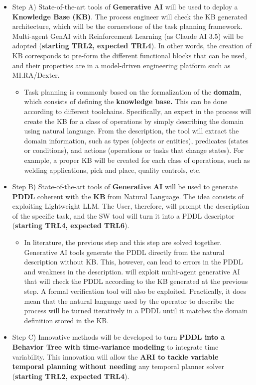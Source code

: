 \begin{itemize}[arrow]
\item
  Step A) State-of-the-art tools of \textbf{Generative AI} will be used
  to deploy a \textbf{Knowledge Base (KB)}. The process engineer will
  check the KB generated architecture, which will be the cornerstone of
  the task planning framework. Multi-agent GenAI with Reinforcement
  Learning (as Claude AI 3.5) will be adopted (\textbf{starting TRL2,
  expected TRL4}). In other words, the creation of KB corresponds to
  pre-form the different functional blocks that can be used, and their
  properties are in a model-driven engineering platform such as
  MI.RA/Dexter.

  \begin{itemize}
  \item
    Task planning is commonly based on the formalization of the
    \textbf{domain}, which consists of defining the \textbf{knowledge
    base.} This can be done according to different toolchains.
    Specifically, an expert in the process will create the KB for a
    class of operations by simply describing the domain using natural
    language. From the description, the tool will extract the domain
    information, such as types (objects or entities), predicates (states
    or conditions), and actions (operations or tasks that change
    states). For example, a proper KB will be created for each class of
    operations, such as welding applications, pick and place, quality
    controls, etc.
  \end{itemize}
\item
  Step B) State-of-the-art tools of \textbf{Generative AI} will be used
  to generate \textbf{PDDL} coherent with the \textbf{KB} from Natural
  Language. The idea consists of exploiting Lightweight LLM. The User,
  therefore, will prompt the description of the specific task, and the
  SW tool will turn it into a PDDL descriptor (\textbf{starting TRL4,
  expected TRL6}).

  \begin{itemize}
  \item
    In literature, the previous step and this step are solved together.
    Generative AI tools generate the PDDL directly from the natural
    description without KB. This, however, can lead to errors in the
    PDDL and weakness in the description.  will exploit
    multi-agent generative AI that will check the PDDL according to the
    KB generated at the previous step. A formal verification tool will
    also be exploited. Practically, it does mean that the natural
    language used by the operator to describe the process will be turned
    iteratively in a PDDL until it matches the domain definition stored
    in the KB.
  \end{itemize}
\item
  Step C) Innovative methods will be developed to turn \textbf{PDDL into
  a Behavior Tree with time-variance modeling} to integrate time
  variability. This innovation will allow the \textbf{ARI to tackle
  variable temporal planning without needing} any temporal planner
  solver (\textbf{starting TRL2, expected TRL4}).


\end{itemize}
